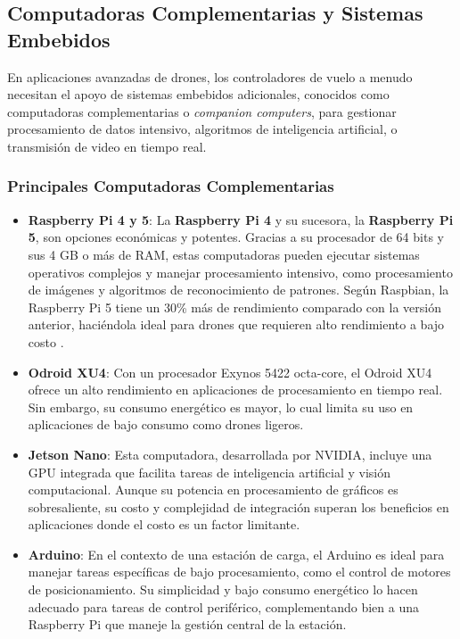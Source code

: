 \documentclass{article}
\begin{document}
\subsection{Computadoras Complementarias y Sistemas Embebidos}

En aplicaciones avanzadas de drones, los controladores de vuelo a menudo necesitan el apoyo de sistemas embebidos adicionales, conocidos como computadoras complementarias o \textit{companion computers}, para gestionar procesamiento de datos intensivo, algoritmos de inteligencia artificial, o transmisión de video en tiempo real.

\subsubsection{Principales Computadoras Complementarias}
\begin{itemize}
    \item \textbf{Raspberry Pi 4 y 5}: La \textbf{Raspberry Pi 4} y su sucesora, la \textbf{Raspberry Pi 5}, son opciones económicas y potentes. Gracias a su procesador de 64 bits y sus 4 GB o más de RAM, estas computadoras pueden ejecutar sistemas operativos complejos y manejar procesamiento intensivo, como procesamiento de imágenes y algoritmos de reconocimiento de patrones. Según Raspbian, la Raspberry Pi 5 tiene un 30\% más de rendimiento comparado con la versión anterior, haciéndola ideal para drones que requieren alto rendimiento a bajo costo \cite{rasp_docs}.
    \item \textbf{Odroid XU4}: Con un procesador Exynos 5422 octa-core, el Odroid XU4 ofrece un alto rendimiento en aplicaciones de procesamiento en tiempo real. Sin embargo, su consumo energético es mayor, lo cual limita su uso en aplicaciones de bajo consumo como drones ligeros.
    \item \textbf{Jetson Nano}: Esta computadora, desarrollada por NVIDIA, incluye una GPU integrada que facilita tareas de inteligencia artificial y visión computacional. Aunque su potencia en procesamiento de gráficos es sobresaliente, su costo y complejidad de integración superan los beneficios en aplicaciones donde el costo es un factor limitante.
    \item \textbf{Arduino}: En el contexto de una estación de carga, el Arduino es ideal para manejar tareas específicas de bajo procesamiento, como el control de motores de posicionamiento. Su simplicidad y bajo consumo energético lo hacen adecuado para tareas de control periférico, complementando bien a una Raspberry Pi que maneje la gestión central de la estación.
\end{itemize}
\end{document}
